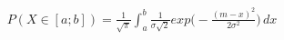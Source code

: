 \documentclass[preview]{standalone}
\begin{document}
\begin{align*}
P( X \in [a;b] ) = { \frac{1}{\sqrt{\pi}} } \int_a^b { { \frac{1}{\sigma \sqrt{2}} } exp\Big(-{ \frac{(m - x)^2}{2 \sigma^2} }\Big) } \, dx
\end{align*}
\end{document}
